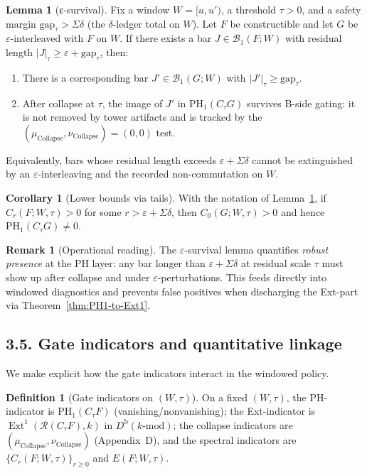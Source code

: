 \documentclass[11pt]{article}
\numberwithin{equation}{section}
\theoremstyle{plain}
\theoremstyle{definition}
\theoremstyle{remark}
\DeclareMathOperator{\Ext}{Ext}
\theoremstyle{plain}
\theoremstyle{definition}
\numberwithin{equation}{section}
\newtheorem{lemma}[theorem]{Lemma}
\newtheorem{corollary}[theorem]{Corollary}
\theoremstyle{definition}
\newtheorem{definition}[theorem]{Definition}
\newtheorem{remark}[theorem]{Remark}
\numberwithin{equation}{section}
\theoremstyle{plain}
\theoremstyle{definition}
\theoremstyle{remark}
\begin{document}
\begin{lemma}[ε-survival]\label{lem:epsilon-survival}
Fix a window \(W=[u,u')\), a threshold \(\tau>0\), and a safety margin \(\mathrm{gap}_\tau>\Sigma\delta\) (the \(\delta\)-ledger total on \(W\)). Let \(F\) be constructible and let \(G\) be \(\varepsilon\)-interleaved with \(F\) on \(W\).
If there exists a bar \(J\in\mathcal{B}_1(F;W)\) with residual length \(|J|_\tau\ge \varepsilon+\mathrm{gap}_\tau\), then:
\begin{enumerate}
\item There is a corresponding bar \(J'\in\mathcal{B}_1(G;W)\) with \(|J'|_\tau\ge \mathrm{gap}_\tau\).
\item After collapse at \(\tau\), the image of \(J'\) in \(\mathrm{PH}_1(C_\tau G)\) survives B-side gating: it is not removed by tower artifacts and is tracked by the \((\mu_{\mathrm{Collapse}},\nu_{\mathrm{Collapse}})=(0,0)\) test.
\end{enumerate}
Equivalently, bars whose residual length exceeds \(\varepsilon+\Sigma\delta\) cannot be extinguished by an \(\varepsilon\)-interleaving and the recorded non-commutation on \(W\).
\end{lemma}

\begin{corollary}[Lower bounds via tails]\label{cor:tail-survival}
With the notation of Lemma~\ref{lem:epsilon-survival}, if \(C_{r}(F;W,\tau)>\!0\) for some \(r>\varepsilon+\Sigma\delta\), then \(C_{0}(G;W,\tau)>\!0\) and hence \(\mathrm{PH}_1(C_\tau G)\neq 0\).
\end{corollary}

\begin{remark}[Operational reading]
The \(\varepsilon\)-survival lemma quantifies \emph{robust presence} at the PH layer: any bar longer than \(\varepsilon+\Sigma\delta\) at residual scale \(\tau\) must show up after collapse and under \(\varepsilon\)-perturbations. This feeds directly into windowed diagnostics and prevents false positives when discharging the Ext-part via Theorem~\ref{thm:PH1-to-Ext1}.
\end{remark}

\subsection*{3.5. Gate indicators and quantitative linkage}
We make explicit how the gate indicators interact in the windowed policy.

\begin{definition}[Gate indicators on \((W,\tau)\)]
On a fixed \((W,\tau)\), the PH-indicator is \(\mathrm{PH}_1(C_\tau F)\) (vanishing/nonvanishing); the Ext-indicator is \(\Ext^1(\mathcal{R}(C_\tau F),k)\) in \(D^{\mathrm{b}}(k\text{-mod})\); the collapse indicators are \((\mu_{\mathrm{Collapse}},\nu_{\mathrm{Collapse}})\) (Appendix~D), and the spectral indicators are \(\{C_r(F;W,\tau)\}_{r\ge 0}\) and \(E(F;W,\tau)\).
\end{definition}
\end{document}
